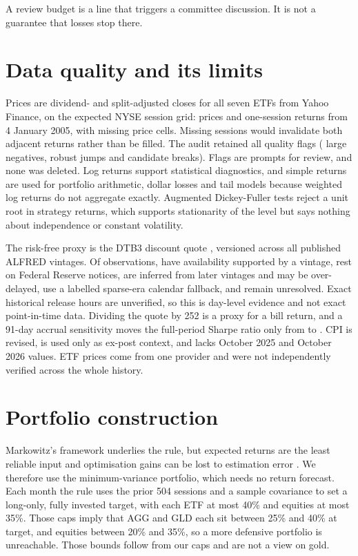 \documentclass[11pt,a4paper]{article}
\begin{document}
A review budget is a line that triggers a committee discussion. It is not a guarantee that losses stop there.

\section{Data quality and its limits}
Prices are dividend- and split-adjusted closes for all seven ETFs from Yahoo Finance, on the expected NYSE session grid: \qePriceSessions{} prices and \qeReturnSessions{} one-session returns from 4 January 2005, with \qeMissingCells{} missing price cells. Missing sessions would invalidate both adjacent returns rather than be filled. The audit retained all \qeFlags{} quality flags (\qeFlagNegative{} large negatives, \qeFlagJump{} robust jumps and \qeFlagBreak{} candidate breaks). Flags are prompts for review, and none was deleted. Log returns support statistical diagnostics, and simple returns are used for portfolio arithmetic, dollar losses and tail models because weighted log returns do not aggregate exactly. Augmented Dickey-Fuller tests reject a unit root in strategy returns, which supports stationarity of the level but says nothing about independence or constant volatility.

The risk-free proxy is the DTB3 discount quote \citep{fredDtb3}, versioned across all \qeVintages{} published ALFRED vintages. Of \qeRfObservations{} observations, \qeRfSupported{} have availability supported by a vintage, \qeRfDocumented{} rest on Federal Reserve notices, \qeRfInferred{} are inferred from later vintages and may be over-delayed, \qeRfFallback{} use a labelled sparse-era calendar fallback, and \qeRfUnresolved{} remain unresolved. Exact historical release hours are unverified, so this is day-level evidence and not exact point-in-time data. Dividing the quote by 252 is a proxy for a bill return, and a 91-day accrual sensitivity moves the full-period Sharpe ratio only from \qeSharpePrimary{} to \qeSharpeAccrual{}. CPI \citep{fredCpi} is revised, is used only as ex-post context, and lacks October 2025 and October 2026 values. ETF prices come from one provider and were not independently verified across the whole history.

\section{Portfolio construction}
Markowitz's framework \citep{markowitz1952} underlies the rule, but expected returns are the least reliable input and optimisation gains can be lost to estimation error \citep{demiguel2009}. We therefore use the minimum-variance portfolio, which needs no return forecast. Each month the rule uses the prior 504 sessions and a sample covariance to set a long-only, fully invested target, with each ETF at most 40\% and equities at most 35\%. Those caps imply that AGG and GLD each sit between 25\% and 40\% at target, and equities between 20\% and 35\%, so a more defensive portfolio is unreachable. Those bounds follow from our caps and are not a view on gold.
\end{document}

